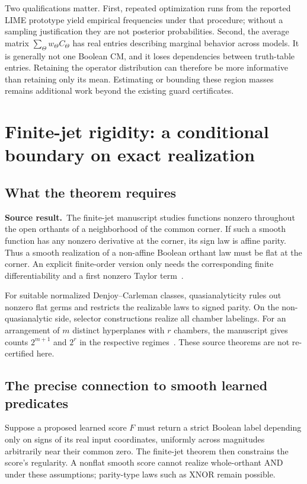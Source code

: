 \documentclass[11pt,a4paper]{article}
\theoremstyle{remark}
\newcommand{\sourceclaim}{\textbf{Source result.}\ }
\begin{document}
Two qualifications matter. First, repeated optimization runs from the reported LIME prototype yield empirical frequencies under that procedure; without a sampling justification they are not posterior probabilities. Second, the average matrix $\sum_\Theta w_\Theta C_\Theta$ has real entries describing marginal behavior across models. It is generally not one Boolean CM, and it loses dependencies between truth-table entries. Retaining the operator distribution can therefore be more informative than retaining only its mean. Estimating or bounding these region masses remains additional work beyond the existing guard certificates.

\section{Finite-jet rigidity: a conditional boundary on exact realization}
\subsection{What the theorem requires}
\sourceclaim The finite-jet manuscript studies functions nonzero throughout the open orthants of a neighborhood of the common corner. If such a smooth function has any nonzero derivative at the corner, its sign law is affine parity. Thus a smooth realization of a non-affine Boolean orthant law must be flat at the corner. An explicit finite-order version only needs the corresponding finite differentiability and a first nonzero Taylor term~\cite[Theorems 4.1 and 4.3]{jet}.

For suitable normalized Denjoy--Carleman classes, quasianalyticity rules out nonzero flat germs and restricts the realizable laws to signed parity. On the non-quasianalytic side, selector constructions realize all chamber labelings. For an arrangement of $m$ distinct hyperplanes with $r$ chambers, the manuscript gives counts $2^{m+1}$ and $2^r$ in the respective regimes~\cite[Sections 5--6]{jet}. These source theorems are not re-certified here.

\subsection{The precise connection to smooth learned predicates}
Suppose a proposed learned score $F$ must return a strict Boolean label depending only on signs of its real input coordinates, uniformly across magnitudes arbitrarily near their common zero. The finite-jet theorem then constrains the score's regularity. A nonflat smooth score cannot realize whole-orthant AND under these assumptions; parity-type laws such as XNOR remain possible.
\end{document}
